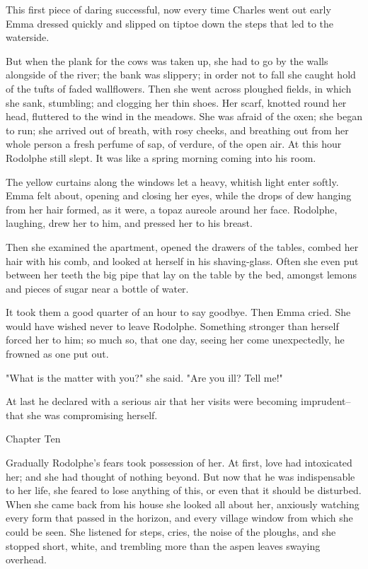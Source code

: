 \documentclass[11pt,twocolumn]{ltugboat}
\begin{document}
This first piece of daring successful, now every time Charles went out
early Emma dressed quickly and slipped on tiptoe down the steps that led
to the waterside.

But when the plank for the cows was taken up, she had to go by the walls
alongside of the river; the bank was slippery; in order not to fall
she caught hold of the tufts of faded wallflowers. Then she went across
ploughed fields, in which she sank, stumbling; and clogging her thin
shoes. Her scarf, knotted round her head, fluttered to the wind in the
meadows. She was afraid of the oxen; she began to run; she arrived out
of breath, with rosy cheeks, and breathing out from her whole person a
fresh perfume of sap, of verdure, of the open air. At this hour Rodolphe
still slept. It was like a spring morning coming into his room.

The yellow curtains along the windows let a heavy, whitish light enter
softly. Emma felt about, opening and closing her eyes, while the drops
of dew hanging from her hair formed, as it were, a topaz aureole around
her face. Rodolphe, laughing, drew her to him, and pressed her to his
breast.

Then she examined the apartment, opened the drawers of the tables,
combed her hair with his comb, and looked at herself in his
shaving-glass. Often she even put between her teeth the big pipe that
lay on the table by the bed, amongst lemons and pieces of sugar near a
bottle of water.

It took them a good quarter of an hour to say goodbye. Then Emma cried.
She would have wished never to leave Rodolphe. Something stronger than
herself forced her to him; so much so, that one day, seeing her come
unexpectedly, he frowned as one put out.

"What is the matter with you?" she said. "Are you ill? Tell me!"

At last he declared with a serious air that her visits were becoming
imprudent--that she was compromising herself.



Chapter Ten

Gradually Rodolphe's fears took possession of her. At first, love had
intoxicated her; and she had thought of nothing beyond. But now that he
was indispensable to her life, she feared to lose anything of this, or
even that it should be disturbed. When she came back from his house she
looked all about her, anxiously watching every form that passed in the
horizon, and every village window from which she could be seen. She
listened for steps, cries, the noise of the ploughs, and she stopped
short, white, and trembling more than the aspen leaves swaying overhead.
\end{document}
